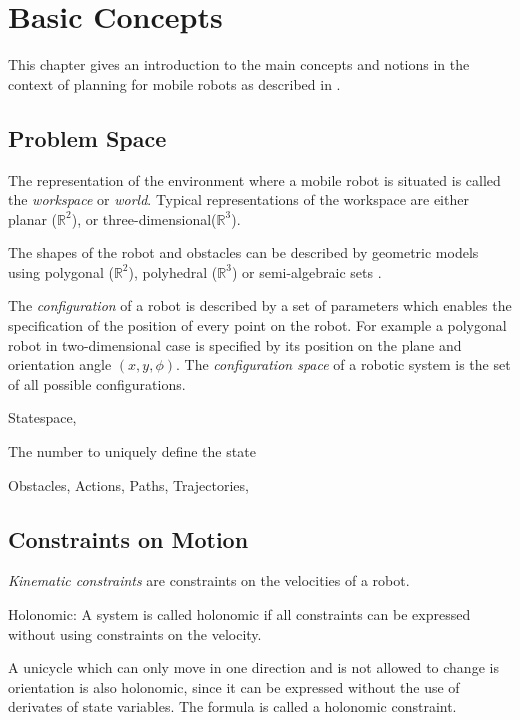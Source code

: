 \chapter{Basic Concepts}\label{ch:introductionplanning}
This chapter gives an introduction to the main concepts and notions in the context of planning for mobile robots as described in \cite{Choset_2005_5167}\cite{LaValle2006}.

\section{Problem Space}\label{sec:basic}
The representation of the environment where a mobile robot is situated is called the \emph{workspace} or \emph{world}.
Typical representations of the workspace are either planar ($\mathbb{R}^2$), or three-dimensional($\mathbb{R}^3$).

The shapes of the robot and obstacles can be described by geometric models using polygonal ($\mathbb{R}^2$), polyhedral ($\mathbb{R}^3$) or semi-algebraic sets \cite{LaValle2006}. 

The \emph{configuration} of a robot is described by a set of parameters which enables the specification of the position of every point on the robot. 
For example a polygonal robot in two-dimensional case is specified by its position on the plane and orientation angle $(x,y,\phi)$. 
The \emph{configuration space} of a robotic system is the set of all possible configurations. 

Statespace,

The number to uniquely define the state 

Obstacles,
Actions,
Paths,
Trajectories,

\section{Constraints on Motion}\label{sec:model}

\emph{Kinematic constraints} are constraints on the velocities of a robot. 


Holonomic:
A system is called holonomic if all constraints can be expressed without using constraints on the velocity. 

A unicycle which can only move in one direction and is not allowed to change is orientation is also holonomic, since  it can be expressed without the use of derivates of state variables.
The formula is called a holonomic constraint.

